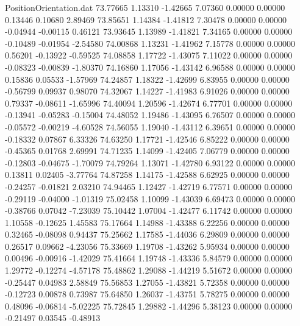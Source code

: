 \begin{filecontents}{PositionOrientation.dat}
  73.77665    1.13310   -1.42665     7.07360    0.00000    0.00000    0.13446    0.10680    2.89469
  73.85651    1.14384   -1.41812     7.30478    0.00000    0.00000   -0.04944   -0.00115    0.46121
  73.93645    1.13989   -1.41821     7.34165    0.00000    0.00000   -0.10489   -0.01954   -2.54580
  74.00868    1.13231   -1.41962     7.15778    0.00000    0.00000    0.56201   -0.13922   -0.59525
  74.08858    1.17722   -1.43075     7.11022    0.00000    0.00000   -0.08323   -0.00839   -1.80370
  74.16860    1.17056   -1.43142     6.96588    0.00000    0.00000    0.15836    0.05533   -1.57969
  74.24857    1.18322   -1.42699     6.83955    0.00000    0.00000   -0.56799    0.09937    0.98070
  74.32067    1.14227   -1.41983     6.91026    0.00000    0.00000    0.79337   -0.08611   -1.65996
  74.40094    1.20596   -1.42674     6.77701    0.00000    0.00000   -0.13941   -0.05283   -0.15004
  74.48052    1.19486   -1.43095     6.76507    0.00000    0.00000   -0.05572   -0.00219   -4.60528
  74.56055    1.19040   -1.43112     6.39651    0.00000    0.00000   -0.18332    0.07867    6.33326
  74.63250    1.17721   -1.42546     6.85222    0.00000    0.00000   -0.45365    0.01768    2.69991
  74.71235    1.14099   -1.42405     7.06779    0.00000    0.00000   -0.12803   -0.04675   -1.70079
  74.79264    1.13071   -1.42780     6.93122    0.00000    0.00000    0.13811    0.02405   -3.77764
  74.87258    1.14175   -1.42588     6.62925    0.00000    0.00000   -0.24257   -0.01821    2.03210
  74.94465    1.12427   -1.42719     6.77571    0.00000    0.00000   -0.29119   -0.04000   -1.01319
  75.02458    1.10099   -1.43039     6.69473    0.00000    0.00000   -0.38766    0.07042   -7.23039
  75.10442    1.07004   -1.42477     6.11742    0.00000    0.00000    1.10558   -0.12625    1.45583
  75.17664    1.14988   -1.43388     6.22256    0.00000    0.00000    0.32465   -0.08098    0.94437
  75.25662    1.17585   -1.44036     6.29809    0.00000    0.00000    0.26517    0.09662   -4.23056
  75.33669    1.19708   -1.43262     5.95934    0.00000    0.00000    0.00496   -0.00916   -1.42029
  75.41664    1.19748   -1.43336     5.84579    0.00000    0.00000    1.29772   -0.12274   -4.57178
  75.48862    1.29088   -1.44219     5.51672    0.00000    0.00000   -0.25447    0.04983    2.58849
  75.56853    1.27055   -1.43821     5.72358    0.00000    0.00000   -0.12723    0.00878    0.73987
  75.64850    1.26037   -1.43751     5.78275    0.00000    0.00000    0.48096   -0.06814   -5.02225
  75.72845    1.29882   -1.44296     5.38123    0.00000    0.00000   -0.21497    0.03545   -0.48913

\end{filecontents}
